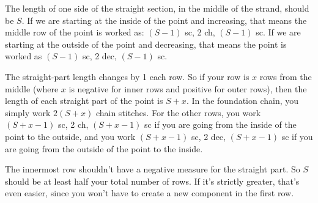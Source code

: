 \documentclass[openany]{book}
\begin{document}
The length of one side of the straight section, in the middle of the strand, should be $S$.  If we are starting at the inside of the point and increasing, that means the middle row of the point is worked as: $(S-1)$ sc, 2 ch, $(S-1)$ sc. If we are starting at the outside of the point and decreasing, that means the point is worked as $(S-1)$ sc, 2 dec, $(S-1)$ sc. 

The straight-part length changes by 1 each row. So if  your row is $x$ rows from the middle (where $x$ is negative for inner rows and positive for outer rows), then the length of each straight part of the point is $S+x$. In the foundation chain, you simply work $2(S+x)$ chain stitches. For the other rows, you work \quad $(S+x-1)$ sc, 2 ch, $(S+x-1)$ sc \quad if you are going from the inside of the point to the outside, and 
you work \quad $(S+x-1)$ sc, 2 dec, $(S+x-1)$ sc \quad if you are going from the outside of the point to the inside.\medskip

The innermost row shouldn't have a negative measure for the straight part. 
So $S$ should be at least half your total number of rows. If it's strictly greater, that's even easier, since you won't have to create a new component in the first row.


%
%
%
%
%
\end{document}
